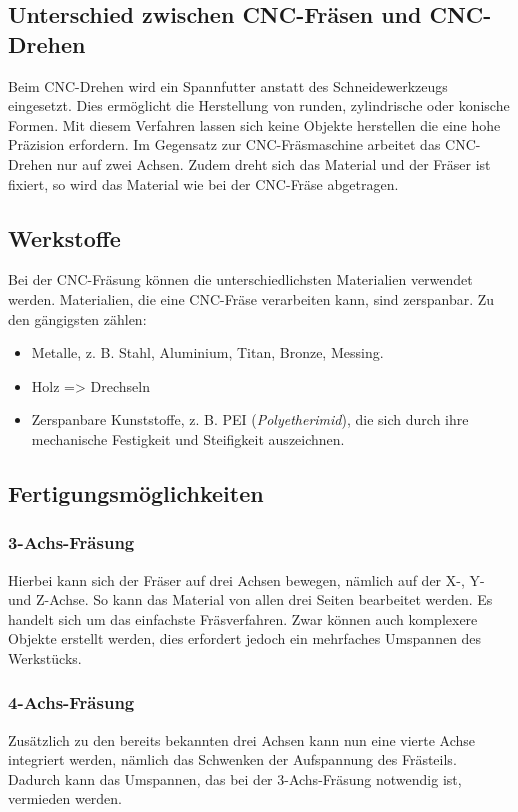 \subsection{Unterschied zwischen CNC-Fräsen und CNC-Drehen}
Beim CNC-Drehen wird ein Spannfutter anstatt des Schneidewerkzeugs eingesetzt. Dies ermöglicht die Herstellung von runden, zylindrische oder konische Formen. Mit diesem Verfahren lassen sich keine Objekte herstellen die eine hohe Präzision erfordern. Im Gegensatz zur CNC-Fräsmaschine arbeitet das CNC-Drehen nur auf zwei Achsen. Zudem dreht sich das Material und der Fräser ist fixiert, so wird das Material wie bei der CNC-Fräse abgetragen. \\
\cite{CNC-Drehen_Unterschied}


\subsection{Werkstoffe}
Bei der CNC-Fräsung können die unterschiedlichsten Materialien verwendet werden. Materialien, die eine CNC-Fräse verarbeiten kann, sind zerspanbar. Zu den gängigsten zählen:

\begin{itemize}
	\item Metalle, z. B. Stahl, Aluminium, Titan, Bronze, Messing.
	\item Holz => Drechseln
	\item Zerspanbare Kunststoffe, z. B. PEI (\emph{Polyetherimid}), die sich durch ihre mechanische Festigkeit und Steifigkeit auszeichnen.
\end{itemize}
\cite{CNC-Fraesen_3} \cite{PEIZerspannung} \cite{PEIKunststoff-Polyetherimid}

\subsection{Fertigungsmöglichkeiten}

\subsubsection{3-Achs-Fräsung}
Hierbei kann sich der Fräser auf drei Achsen bewegen, nämlich auf der X-, Y- und Z-Achse. So kann das Material von allen drei Seiten bearbeitet werden. Es handelt sich um das einfachste Fräsverfahren. Zwar können auch komplexere Objekte erstellt werden, dies erfordert jedoch ein mehrfaches Umspannen des Werkstücks.

\subsubsection{4-Achs-Fräsung}
Zusätzlich zu den bereits bekannten drei Achsen kann nun eine vierte Achse integriert werden, nämlich das Schwenken der Aufspannung des Frästeils. Dadurch kann das Umspannen, das bei der 3-Achs-Fräsung notwendig ist, vermieden werden.

